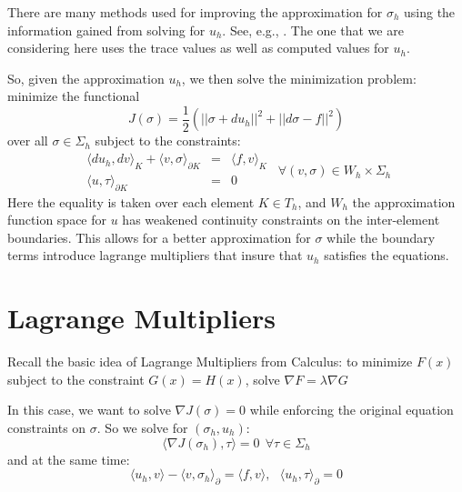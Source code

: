 \documentclass{article}
\begin{document}
There are many methods used for improving the approximation for $\sigma_h$ 
using the information gained from solving for $u_h$. 
See, e.g., \cite{ckk02}.
The one that we are 
considering here uses the trace values as well as computed values for $u_h$. 

So, given the approximation $u_h$, we then solve the minimization problem:
minimize the functional 
$$J(\sigma)=\frac{1}{2}\left(||\sigma+du_h||^2+||d\sigma-f||^2\right)$$
over all $\sigma\in\Sigma_h$ 
subject to the constraints: 
$$\begin{array}{rcl}
	\langle du_h,dv\rangle_K+\langle v,\sigma\rangle_{\partial K}
		&=&\langle f,v\rangle_K\\
	\langle u,\tau\rangle_{\partial K}&=&0
\end{array}~~\forall (v,\sigma)\in W_h\times\Sigma_h$$
Here the equality is taken over each element $K\in T_h$, and 
$W_h$ the approximation function space for $u$ has weakened continuity 
constraints on the inter-element boundaries. This allows for a better 
approximation for $\sigma$ while the boundary terms introduce lagrange 
multipliers that insure that $u_h$ satisfies the equations.  

\section{Lagrange Multipliers}
Recall the basic idea of Lagrange Multipliers from Calculus: 
to minimize $F(x)$ subject to the constraint $G(x) = H(x)$, 
solve $\nabla F=\lambda\nabla G$ 

In this case, we want to solve $\nabla J(\sigma)=0$ while enforcing 
the original equation constraints on $\sigma$. 
So we solve for $(\sigma_h, u_h)$: 
$$\langle\nabla J(\sigma_h), \tau\rangle = 0~~\forall\tau\in\Sigma_h$$
and at the same time:  
$$
\langle u_h,v\rangle-\langle v,\sigma_h\rangle_\partial=\langle f,v\rangle,~~~
\langle u_h,\tau\rangle_\partial = 0
$$


\printbibliography
\end{document}
